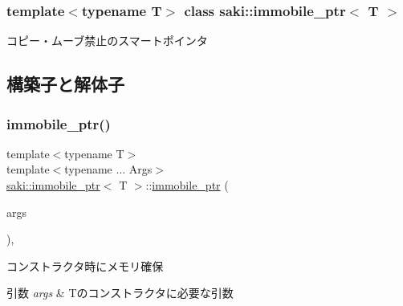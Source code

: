 \subsubsection*{template$<$typename T$>$\newline
class saki\+::immobile\+\_\+ptr$<$ T $>$}

コピー・ムーブ禁止のスマートポインタ 

\subsection{構築子と解体子}
\mbox{\label{classsaki_1_1immobile__ptr_aa64c721ab505396e3b7b75bb6916b562}} 
\subsubsection{\texorpdfstring{immobile\+\_\+ptr()}{immobile\_ptr()}\hspace{0.1cm}{\footnotesize\ttfamily [1/3]}}
{\footnotesize\ttfamily template$<$typename T$>$ \\
template$<$typename ... Args$>$ \\
\mbox{\hyperlink{classsaki_1_1immobile__ptr}{saki\+::immobile\+\_\+ptr}}$<$ T $>$\+::\mbox{\hyperlink{classsaki_1_1immobile__ptr}{immobile\+\_\+ptr}} (\begin{DoxyParamCaption}\item[{Args...}]{args }\end{DoxyParamCaption})\hspace{0.3cm}{\ttfamily [inline]}, {\ttfamily [explicit]}}



コンストラクタ時にメモリ確保 


\begin{DoxyParams}{引数}
{\em args} & Tのコンストラクタに必要な引数 \\
\hline
\end{DoxyParams}
\mbox{\label{classsaki_1_1immobile__ptr_a7cb3ccfa2a366adfe164a0ba6c0f86d6}} 
